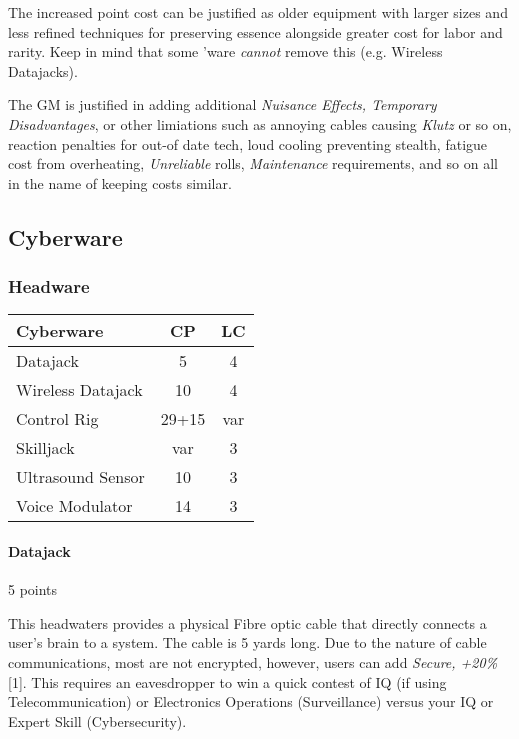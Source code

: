 \begin{multicols*}{3}
	The increased point cost can be justified as older equipment with larger sizes and less refined techniques for preserving essence alongside greater cost for labor and rarity. Keep in mind that some 'ware \textit{cannot} remove this (e.g. Wireless Datajacks). 
	
	The GM is justified in adding additional \textit{Nuisance Effects, Temporary Disadvantages}, or other limiations such as annoying cables causing \textit{Klutz} or so on, reaction penalties for out-of date tech, loud cooling preventing stealth, fatigue cost from overheating, \textit{Unreliable} rolls, \textit{Maintenance} requirements, and so on all in the name of keeping costs similar.
	
	\subsection{Cyberware}
	
	\subsubsection{Headware}
	
	\begin{center}
		\begin{tabularx}{0.32\textwidth}{|X|c|c|}
			\hline
			Cyberware & CP & LC\\
			\hline
			\hline
			Datajack & 5 & 4\\
			Wireless Datajack & 10 & 4\\
			Control Rig & 29+15 & var\\
			Skilljack & var & 3 \\
			Ultrasound Sensor & 10 & 3 \\
			Voice Modulator & 14 & 3 \\
			\hline
		\end{tabularx}
	\end{center}
	
	\paragraph{Datajack}
	\begin{flushright}
		5 points
	\end{flushright}
	
	This headwaters provides a physical Fibre optic cable that directly connects a user's brain to a system. The cable is 5 yards long. Due to the nature of cable communications, most are not encrypted, however, users can add \textit{Secure, +20\%} [1]. This requires an eavesdropper to win a quick contest of IQ (if using Telecommunication) or Electronics Operations (Surveillance) versus your IQ or Expert Skill (Cybersecurity).
	

\end{multicols*}
